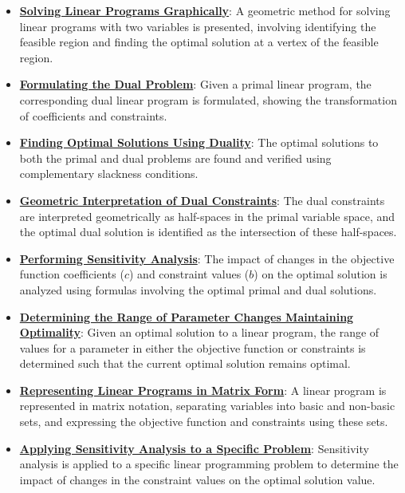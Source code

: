 \documentclass{article}%
\begin{document}
\begin{itemize}[leftmargin=*]%
\item \href{https://www.math.purdue.edu/~yipn/421/2024-12-03-Duality.pdf#page=3}{\textbf{Solving Linear Programs Graphically}}: A geometric method for solving linear programs with two variables is presented, involving identifying the feasible region and finding the optimal solution at a vertex of the feasible region.%
\item \href{https://www.math.purdue.edu/~yipn/421/2024-12-03-Duality.pdf#page=5}{\textbf{Formulating the Dual Problem}}: Given a primal linear program, the corresponding dual linear program is formulated, showing the transformation of coefficients and constraints.%
\item \href{https://www.math.purdue.edu/~yipn/421/2024-12-03-Duality.pdf#page=8}{\textbf{Finding Optimal Solutions Using Duality}}: The optimal solutions to both the primal and dual problems are found and verified using complementary slackness conditions.%
\item \href{https://www.math.purdue.edu/~yipn/421/2024-12-03-Duality.pdf#page=9}{\textbf{Geometric Interpretation of Dual Constraints}}: The dual constraints are interpreted geometrically as half-spaces in the primal variable space, and the optimal dual solution is identified as the intersection of these half-spaces.%
\item \href{https://www.math.purdue.edu/~yipn/421/2024-12-03-Duality.pdf#page=11}{\textbf{Performing Sensitivity Analysis}}: The impact of changes in the objective function coefficients ($c$) and constraint values ($b$) on the optimal solution is analyzed using formulas involving the optimal primal and dual solutions.%
\item \href{https://www.math.purdue.edu/~yipn/421/2024-12-03-Duality.pdf#page=16}{\textbf{Determining the Range of Parameter Changes Maintaining Optimality}}: Given an optimal solution to a linear program, the range of values for a parameter in either the objective function or constraints is determined such that the current optimal solution remains optimal.%
\item \href{https://www.math.purdue.edu/~yipn/421/2024-12-03-Duality.pdf#page=22}{\textbf{Representing Linear Programs in Matrix Form}}: A linear program is represented in matrix notation, separating variables into basic and non-basic sets, and expressing the objective function and constraints using these sets.%
\item \href{https://www.math.purdue.edu/~yipn/421/2024-12-03-Duality.pdf#page=26}{\textbf{Applying Sensitivity Analysis to a Specific Problem}}: Sensitivity analysis is applied to a specific linear programming problem to determine the impact of changes in the constraint values on the optimal solution value.%

\end{itemize}
\end{document}
